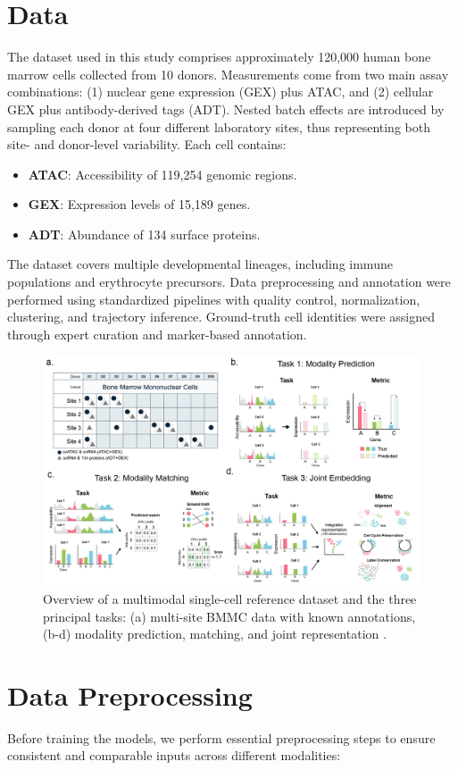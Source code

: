 \documentclass{article}
\begin{document}
\section{Data}
The dataset used in this study comprises approximately 120,000 human bone marrow cells 
collected from 10 donors. Measurements come from two main assay combinations: 
(1) nuclear gene expression (GEX) plus ATAC, and (2) cellular GEX plus antibody-derived tags (ADT). 
Nested batch effects are introduced by sampling each donor at four different laboratory sites, 
thus representing both site- and donor-level variability. Each cell contains:
\begin{itemize}
    \item \textbf{ATAC}: Accessibility of 119,254 genomic regions.
    \item \textbf{GEX}: Expression levels of 15,189 genes.
    \item \textbf{ADT}: Abundance of 134 surface proteins.
\end{itemize}

The dataset covers multiple developmental lineages, including immune populations 
and erythrocyte precursors. Data preprocessing and annotation were performed 
using standardized pipelines with quality control, normalization, clustering, 
and trajectory inference. Ground-truth cell identities were assigned 
through expert curation and marker-based annotation.

\begin{figure}[H]
  \centering
  \includegraphics[width=0.8\linewidth]{multimodal_intro}
  \caption{ Overview of a multimodal single-cell reference dataset and the three principal tasks: 
  (a) multi-site BMMC data with known annotations, 
  (b-d) modality prediction, matching, and joint representation \cite{luecken2020sandbox}.}
  \label{fig:dataset}
\end{figure}

\section{Data Preprocessing}
Before training the models, we perform essential preprocessing steps to ensure consistent 
and comparable inputs across different modalities:
\end{document}
